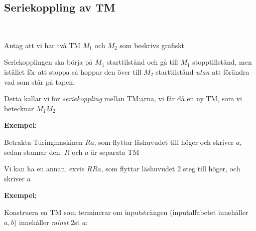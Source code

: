 \subsection{Seriekoppling av TM}\hfill\\\par
\noindent Antag att vi har två TM $M_1$ och $M_2$ som beskrivs grafiskt\par
\noindent Seriekopplingen ska börja på $M_1$ starttilstånd och gå till $M_1$ stopptillstånd, men istället för att stoppa så hoppar den över till $M_2$ starttilstånd \textit{utan} att förändra vad som står på tapen.\par
\noindent Detta kallar vi för \textit{seriekoppling} mellan TM:arna, vi får då en ny TM, som vi betecknar $M_1M_2$ 
\par\bigskip
\noindent\textbf{Exempel:}\par
\noindent Betrakta Turingmaskinen $Ra$, som flyttar läshuvudet till höger och skriver $a$, sedan stannar den. $R$ och $a$ är separata TM\par
\noindent Vi kan ha en annan, exvis $RRa$, som flyttar läshuvudet 2 steg till höger, och skriver $a$
\par\bigskip
\noindent\textbf{Exempel:}\par
\noindent Konstruera en TM som terminerar om inputsträngen (inputalfabetet innehåller $a,b$) innehåller \textit{minst} 2st $a$:
\begin{figure}[ht!]
    \centering
    \caption{}
\end{figure}

